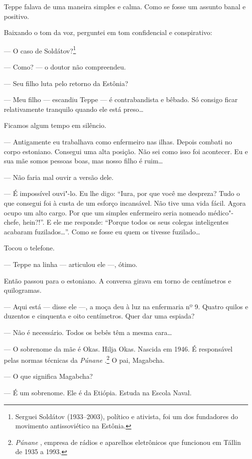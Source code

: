 Teppe falava de uma maneira simples e calma. Como se fosse um assunto
banal e positivo.

Baixando o tom da voz, perguntei em tom confidencial e conspirativo:

--- O caso de Soldátov?\footnote{Serguei Soldátov (1933--2003),
  político e ativista, foi um dos fundadores do movimento antissoviético
  na Estônia.}

--- Como? --- o doutor não compreendeu.

--- Seu filho luta pelo retorno da Estônia?

--- Meu filho --- escandiu Teppe --- é contrabandista e bêbado. Só
consigo ficar relativamente tranquilo quando ele está preso\ldots{}

Ficamos algum tempo em silêncio.

--- Antigamente eu trabalhava como enfermeiro nas ilhas. Depois combati
no corpo estoniano. Consegui uma alta posição. Não sei como isso foi
acontecer. Eu e sua mãe somos pessoas boas, mas nosso filho é ruim\ldots{}

--- Não faria mal ouvir a versão dele.

--- É impossível ouvi"-lo. Eu lhe digo: ``Iura, por que você me despreza?
Tudo o que consegui foi à custa de um esforço incansável. Não tive uma
vida fácil. Agora ocupo um alto cargo. Por que um simples enfermeiro
seria nomeado médico"-chefe, hein?!''. E ele me responde: ``Porque todos
os seus colegas inteligentes acabaram fuzilados\ldots{}''. Como se fosse eu
quem os tivesse fuzilado\ldots{}

Tocou o telefone.

--- Teppe na linha --- articulou ele ---, ótimo.

Então passou para o estoniano. A conversa girava em torno de centímetros
e quilogramas.

--- Aqui está --- disse ele ---, a moça deu à luz na enfermaria nº 9.
Quatro quilos e duzentos e cinquenta e oito centímetros. Quer dar uma
espiada?

--- Não é necessário. Todos os bebês têm a mesma cara\ldots{}

--- O sobrenome da mãe é Okas. Hilja Okas. Nascida em 1946. É
responsável pelas normas técnicas da \emph{Púnane }.\footnote{\emph{Púnane
  }, empresa de rádios e aparelhos eletrônicos que funcionou em
  Tállin de 1935 a 1993.} O pai, Magabcha.

--- O que significa Magabcha?

--- É um sobrenome. Ele é da Etiópia. Estuda na Escola Naval.


